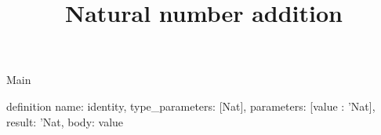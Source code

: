 \begin{lexlean}{Main}
\title{Natural number addition}
\begin{semanticmodule}
definition{
  name: identity,
  type_parameters: [Nat],
  parameters: [value : 'Nat],
  result: 'Nat,
  body: value
}
\end{semanticmodule}
\end{lexlean}
